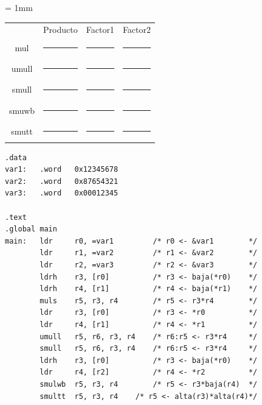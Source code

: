 \begin{center}
\small
\colorbox[gray]{0.9}{
\tabcolsep = 1mm
\begin{tabular}{cccc}
& Producto & Factor1 & Factor2 \\
mul & 
\colorbox[gray]{1}{\rule{4cm}{0cm}\rule{0cm}{0.46cm}} &
\colorbox[gray]{1}{\rule{2cm}{0cm}\rule{0cm}{0.46cm}} &
\colorbox[gray]{1}{\rule{2cm}{0cm}\rule{0cm}{0.46cm}} \\
umull & 
\colorbox[gray]{1}{\rule{4cm}{0cm}\rule{0cm}{0.46cm}} &
\colorbox[gray]{1}{\rule{2cm}{0cm}\rule{0cm}{0.46cm}} &
\colorbox[gray]{1}{\rule{2cm}{0cm}\rule{0cm}{0.46cm}} \\
smull & 
\colorbox[gray]{1}{\rule{4cm}{0cm}\rule{0cm}{0.46cm}} &
\colorbox[gray]{1}{\rule{2cm}{0cm}\rule{0cm}{0.46cm}} &
\colorbox[gray]{1}{\rule{2cm}{0cm}\rule{0cm}{0.46cm}} \\
smuwb & 
\colorbox[gray]{1}{\rule{4cm}{0cm}\rule{0cm}{0.46cm}} &
\colorbox[gray]{1}{\rule{2cm}{0cm}\rule{0cm}{0.46cm}} &
\colorbox[gray]{1}{\rule{2cm}{0cm}\rule{0cm}{0.46cm}} \\
smutt & 
\colorbox[gray]{1}{\rule{4cm}{0cm}\rule{0cm}{0.46cm}} &
\colorbox[gray]{1}{\rule{2cm}{0cm}\rule{0cm}{0.46cm}} &
\colorbox[gray]{1}{\rule{2cm}{0cm}\rule{0cm}{0.46cm}} \\
\end{tabular}
}
\end{center}

\begin{lstlisting}[caption={Código del programa intro5.s},label={lst:codigoPract5}]
.data
var1:   .word   0x12345678
var2:   .word   0x87654321
var3:   .word   0x00012345

.text
.global main
main:   ldr     r0, =var1         /* r0 <- &var1        */
        ldr     r1, =var2         /* r1 <- &var2        */
        ldr     r2, =var3         /* r2 <- &var3        */
        ldrh    r3, [r0]          /* r3 <- baja(*r0)    */
        ldrh    r4, [r1]          /* r4 <- baja(*r1)    */
        muls    r5, r3, r4        /* r5 <- r3*r4        */
        ldr     r3, [r0]          /* r3 <- *r0          */
        ldr     r4, [r1]          /* r4 <- *r1          */
        umull   r5, r6, r3, r4    /* r6:r5 <- r3*r4     */
        smull   r5, r6, r3, r4    /* r6:r5 <- r3*r4     */
        ldrh    r3, [r0]          /* r3 <- baja(*r0)    */
        ldr     r4, [r2]          /* r4 <- *r2          */
        smulwb  r5, r3, r4        /* r5 <- r3*baja(r4)  */
        smultt  r5, r3, r4    /* r5 <- alta(r3)*alta(r4)*/
\end{lstlisting}



\chapterend{}

